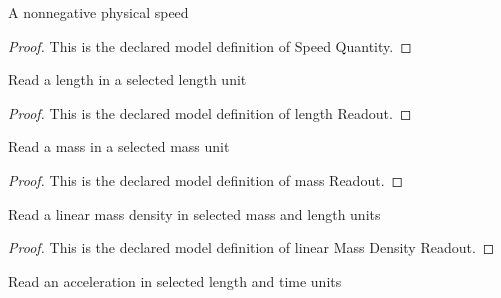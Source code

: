 \begin{definition}
  \label{def:physics:phyx-mini-0306:phyxminiproblems-problemphyxmini0306-speedquantity}
  A nonnegative physical speed
\end{definition}
\begin{proof}
  This is the declared model definition of Speed Quantity.
\end{proof}
\begin{definition}
  \label{def:physics:phyx-mini-0306:phyxminiproblems-problemphyxmini0306-lengthreadout}
  Read a length in a selected length unit
\end{definition}
\begin{proof}
  This is the declared model definition of length Readout.
\end{proof}
\begin{definition}
  \label{def:physics:phyx-mini-0306:phyxminiproblems-problemphyxmini0306-massreadout}
  Read a mass in a selected mass unit
\end{definition}
\begin{proof}
  This is the declared model definition of mass Readout.
\end{proof}
\begin{definition}
  \label{def:physics:phyx-mini-0306:phyxminiproblems-problemphyxmini0306-linearmassdensityreadout}
  Read a linear mass density in selected mass and length units
\end{definition}
\begin{proof}
  This is the declared model definition of linear Mass Density Readout.
\end{proof}
\begin{definition}
  \label{def:physics:phyx-mini-0306:phyxminiproblems-problemphyxmini0306-accelerationreadout}
  Read an acceleration in selected length and time units
\end{definition}

